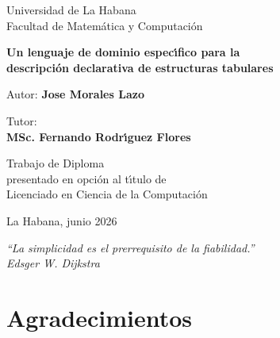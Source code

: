 \documentclass[12pt,a4paper]{report}
\theoremstyle{defstyle}
\begin{document}
\begin{titlepage}
\centering
{\large Universidad de La Habana\\
Facultad de Matem\'atica y Computaci\'on}

\vspace{2cm}
\vspace{2cm}

{\LARGE\bfseries Un lenguaje de dominio espec\'{\i}fico para la\\[6pt]
descripci\'on declarativa de estructuras tabulares}

\vspace{2.5cm}

{\large Autor: \textbf{Jose Morales Lazo}}

\vspace{0.8cm}

{\large Tutor:\\
\textbf{MSc. Fernando Rodr\'{\i}guez Flores}}

\vspace{2cm}

{\normalsize Trabajo de Diploma\\
presentado en opci\'on al t\'{\i}tulo de\\
Licenciado en Ciencia de la Computaci\'on}

\vfill
{\normalsize La Habana, junio 2026}
\end{titlepage}

\thispagestyle{empty}
\vspace*{8cm}
\begin{flushright}
\itshape ``La simplicidad es el prerrequisito de la fiabilidad.''\\[4pt]
\upshape Edsger W. Dijkstra
\end{flushright}
\newpage

\chapter*{Agradecimientos}
\thispagestyle{plain}
\end{document}
